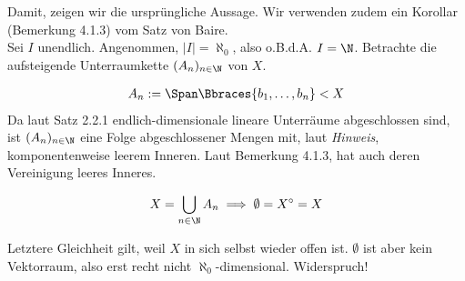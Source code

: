 \begin{solution}
Damit, zeigen wir die ursprüngliche Aussage.
Wir verwenden zudem ein Korollar (Bemerkung 4.1.3) vom Satz von Baire. \\

Sei $I$ unendlich.
Angenommen, $|I| = \aleph_0$, also o.B.d.A. $I = \N$.
Betrachte die aufsteigende Unterraumkette $(A_n)_{n \in \N}$ von $X$.

\begin{align*}
  A_n := \Span \Bbraces{b_1, \ldots, b_n} < X
\end{align*}
Da laut Satz 2.2.1 endlich-dimensionale lineare Unterräume abgeschlossen sind, ist
$(A_n)_{n \in \N}$ eine Folge abgeschlossener Mengen mit, laut \textit{Hinweis}, komponentenweise leerem Inneren.
Laut Bemerkung 4.1.3, hat auch deren Vereinigung leeres Inneres.

\begin{align*}
  X = \bigcup_{n \in \N} A_n
  \implies
  \emptyset = X^\circ = X
\end{align*}

Letztere Gleichheit gilt, weil $X$ in sich selbst wieder offen ist.
$\emptyset$ ist aber kein Vektorraum, also erst recht nicht $\aleph_0$-dimensional.
Widerspruch!

\end{solution}
